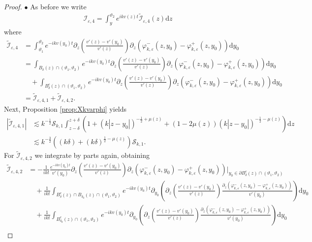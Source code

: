 \documentclass[11pt,reqno]{amsproc}
\newcommand{\bullpar}[1]{\vspace{.5em}\noindent $\bullet$ \normalfont {\bfseries #1.}}
\theoremstyle{definition}
\numberwithin{equation}{section}
\newcommand{\cI}{{\mathcal I}}
\newcommand{\cS}{{\mathcal S}}
\renewcommand{\d}{\mathrm{d}}
\newcommand{\ep}{\varepsilon}
\begin{document}
\begin{proof}
\bullpar{Estimates for $\cI_{\ep,4}$}
As before we write
\begin{align*}
\cI_{\ep,4} = \int_{y}^{\vartheta_2}e^{ikv(z)t} \widetilde\cI_{\ep,4}(z) \d z
\end{align*}
where 
\begin{align*}
\widetilde\cI_{\ep,4} &= \int_{\vartheta_1}^{\vartheta_2} e^{-ikv(y_0)t} \partial_z \left( \frac{v'(z) - v'(y_0)}{v'(z)} \right) \partial_z\left( \varphi_{k,\ep}^-(z,y_0) - \varphi_{k,\ep}^+(z,y_0) \right) \d y_0  \\
&=\int_{B_\delta(z)\cap(\vartheta_1,\vartheta_2)} e^{-ikv(y_0)t} \partial_z \left( \frac{v'(z) - v'(y_0)}{v'(z)} \right) \partial_z\left( \varphi_{k,\ep}^-(z,y_0) - \varphi_{k,\ep}^+(z,y_0) \right) \d y_0 \\
&\quad + \int_{B_\delta^c(z)\cap(\vartheta_1,\vartheta_2)} e^{-ikv(y_0)t} \partial_z \left( \frac{v'(z) - v'(y_0)}{v'(z)} \right) \partial_z\left( \varphi_{k,\ep}^-(z,y_0) - \varphi_{k,\ep}^+(z,y_0) \right) \d y_0  \\
&=\widetilde\cI_{\ep,4,1} + \widetilde\cI_{\ep,4,2}.
\end{align*}
Next, Proposition \ref{prop:Xkvarphi} yields
\begin{align*}
|\widetilde\cI_{\ep,4,1}| &\lesssim k^{-\frac12}\cS_{k,1} \int_{z-\delta}^{z+\delta} \left( 1 +  (k|z-y_0|)^{-\frac12+\mu(z)} + (1-2\mu(z))(k|z-y_0|)^{-\frac12-\mu(z)} \right) \d z \\
&\lesssim k^{-\frac32} \left( (k\delta) + (k\delta)^{\frac12-\mu(z)} \right)\cS_{k,1}.
\end{align*}
For $\widetilde\cI_{\ep,4,2}$ we integrate by parts again, obtaining
\begin{align*}
\widetilde\cI_{\ep,4,2} &= -\frac{1}{ikt} \frac{e^{-ikv(y_0)t}}{v'(y_0)}\partial_z \left( \frac{v'(z) - v'(y_0)}{v'(z)} \right) \partial_z\left( \varphi_{k,\ep}^-(z,y_0) - \varphi_{k,\ep}^+(z,y_0) \right) \Big|_{y_0\in \partial B_\delta^c(z)\cap (\vartheta_1,\vartheta_2)} \\
&\quad +\frac{1}{ikt} \int_{B_\delta^c(z)\cap B_{\delta_0}(z)\cap(\vartheta_1,\vartheta_2)}{e^{-ikv(y_0)t}} \partial_{y_0} \left( \partial_z \left( \frac{v'(z) - v'(y_0)}{v'(z)} \right) \frac{\partial_z\left( \varphi_{k,\ep}^-(z,y_0) - \varphi_{k,\ep}^+(z,y_0) \right)}{v'(y_0)} \right) \d y_0 \\
&\quad +\frac{1}{ikt} \int_{B_{\delta_0}^c(z)\cap(\vartheta_1,\vartheta_2)}{e^{-ikv(y_0)t}} \partial_{y_0} \left( \partial_z \left( \frac{v'(z) - v'(y_0)}{v'(z)} \right) \frac{\partial_z\left( \varphi_{k,\ep}^-(z,y_0) - \varphi_{k,\ep}^+(z,y_0) \right)}{v'(y_0)} \right) \d y_0 \\

\end{align*}
\end{proof}
\end{document}
